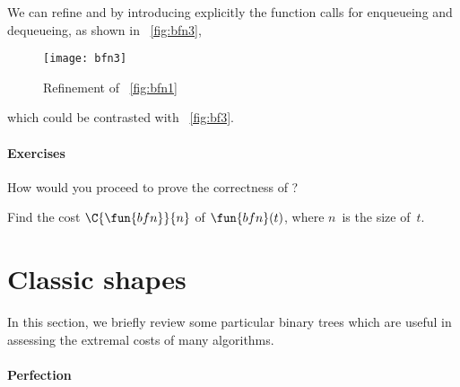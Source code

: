 We can refine  and
 by introducing
explicitly the function calls for enqueueing and dequeueing, as shown
in \fig~\vref{fig:bfn3},
\begin{figure}[t]
\centering
\texttt{[image: bfn3]}
\caption{Refinement of \fig~\vref{fig:bfn1}}
\label{fig:bfn3}
\end{figure}
which could be contrasted with \fig~\vref{fig:bf3}.

\paragraph{Exercises}
\begin{enumerate*}

  \item How would you proceed to prove the correctness of
  ?

  \item Find the cost \(\C{\fun{bfn}}{n}\) of \(\fun{bfn}(t)\), where
  \(n\)~is the size
  of~\(t\).

\end{enumerate*}



\section{Classic shapes}

In this section, we briefly review some particular binary trees which
are useful in assessing the extremal costs of many algorithms.

\paragraph{Perfection}
\label{par:perfection}

